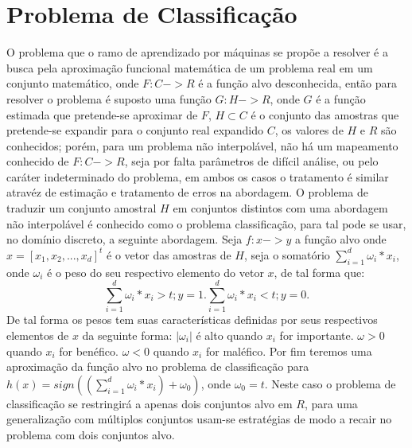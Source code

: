 \documentclass[pfc]{imetex}
\begin{document}
\section{Problema de Classificação}
   O problema que o ramo de aprendizado por máquinas se propõe a resolver é a busca pela aproximação funcional matemática de um problema real em um conjunto matemático, onde $F:C -> R$ é a função alvo desconhecida, então para resolver o problema é suposto uma função $G:H -> R$, onde $G$ é a função estimada que pretende-se aproximar de $F$, $H \subset C$ é o conjunto das amostras que pretende-se expandir para o conjunto real expandido $C$, os valores de $H$ e $R$ são conhecidos; porém, para um problema não interpolável, não há um mapeamento conhecido de $F:C -> R$, seja por falta parâmetros de difícil análise, ou pelo caráter indeterminado do problema, em ambos os casos o tratamento é similar atravéz de estimação e tratamento de erros na abordagem.
    \newline
    \newline
    O problema de traduzir um conjunto amostral $H$ em conjuntos distintos com uma abordagem não interpolável é conhecido como o problema classificação, para tal pode se usar, no domínio discreto, a seguinte abordagem. Seja $f: x->y$ a função alvo onde $x = [x_1,x_2,...,x_d]^t$ é o vetor das amostras de $H$, seja o somatório $\sum\limits_{i=1}^d \omega_i*x_i$, onde $\omega_i$ é o peso do seu respectivo elemento do vetor $x$, de tal forma que:
    \newline
    \begin{equation}
        \sum\limits_{i=1}^d \omega_i*x_i>t; y = 1.
        \sum\limits_{i=1}^d \omega_i*x_i<t; y = 0.
    \end{equation}
    \newline
    De tal forma os pesos tem suas características definidas por seus respectivos elementos de $x$ da seguinte forma:\newline
    $|\omega_i|$ é alto quando $x_i$ for importante.\newline
    $\omega > 0$ quando $x_i$ for benéfico.\newline
    $\omega < 0$ quando $x_i$ for maléfico.\newline
    Por fim teremos uma aproximação da função alvo no problema de classificação para $h(x) = sign((\sum\limits_{i=1}^d \omega_i*x_i)+\omega_0)$, onde $\omega_0 = t$.
    \newline
    Neste caso o problema de classificação se restringirá a apenas dois conjuntos alvo em $R$, para uma generalização com múltiplos conjuntos usam-se estratégias de modo a recair no problema com dois conjuntos alvo.
\end{document}
